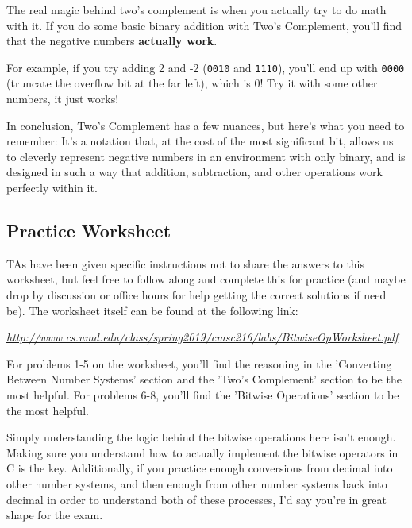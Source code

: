 \documentclass[english, 10pt]{article}
\begin{document}
The real magic behind two's complement is when you actually try to do math with it. If you do some basic binary addition with Two's Complement, you'll find that the negative numbers \textbf{actually work}.\newline

For example, if you try adding 2 and -2 (\texttt{0010} and \texttt{1110}), you'll end up with \texttt{0000} (truncate the overflow bit at the far left), which is 0! Try it with some other numbers, it just works!\newline

In conclusion, Two's Complement has a few nuances, but here's what you need to remember: It's a notation that, at the cost of the most significant bit, allows us to cleverly represent negative numbers in an environment with only binary, and is designed in such a way that addition, subtraction, and other operations work perfectly within it.

\subsection{Practice Worksheet}

TAs have been given specific instructions not to share the answers to this worksheet, but feel free to follow along and complete this for practice (and maybe drop by discussion or office hours for help getting the correct solutions if need be). The worksheet itself can be found at the following link:\newline

{
\textit{
\href{http://www.cs.umd.edu/class/spring2019/cmsc216/labs/BitwiseOpWorksheet.pdf}{http://www.cs.umd.edu/class/spring2019/cmsc216/labs/BitwiseOpWorksheet.pdf}\newline
}
}


For problems 1-5 on the worksheet, you'll find the reasoning in the 'Converting Between Number Systems' section and the 'Two's Complement' section to be the most helpful. For problems 6-8, you'll find the 'Bitwise Operations' section to be the most helpful.\newline

Simply understanding the logic behind the bitwise operations here isn't enough. Making sure you understand how to actually implement the bitwise operators in C is the key. Additionally, if you practice enough conversions from decimal into other number systems, and then enough from other number systems back into decimal in order to understand both of these processes, I'd say you're in great shape for the exam.
\end{document}
